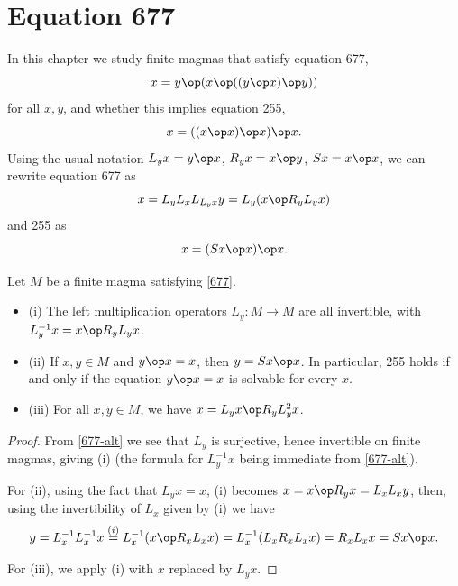 \chapter{Equation 677}\label{677-chapter}

In this chapter we study finite magmas that satisfy equation 677,
\begin{equation}\label{677}
  x = y \op (x \op ((y \op x) \op y))
\end{equation}
for all $x,y$, and whether this implies equation 255,
\begin{equation}\label{255}
  x = ((x \op x) \op x) \op x.
\end{equation}
Using the usual notation $L_y x = y \op x$, $R_y x = x \op y$, $Sx = x \op x$, we can rewrite equation 677 as
\begin{equation}\label{677-alt}
  x = L_y L_x L_{L_y x} y = L_y (x \op R_y L_y x)
\end{equation}
and 255 as
$$ x = (Sx \op x) \op x.$$

\begin{lemma}\label{677-basic} Let $M$ be a finite magma satisfying \eqref{677}.
  \begin{itemize}
  \item (i)  The left multiplication operators $L_y: M \to M$ are all invertible, with $L_y^{-1} x = x \op R_y L_y x$.
  \item (ii) If $x,y \in M$ and $y \op x = x$, then $y = Sx \op x$.  In particular, 255 holds if and only if the equation $y \op x = x$ is solvable for every $x$.
  \item (iii)  For all $x,y \in M$, we have $x = L_y x \op R_y L_y^2 x$.
\end{itemize}
\end{lemma}

\begin{proof}  From \eqref{677-alt} we see that $L_y$ is surjective, hence invertible on finite magmas, giving (i) (the formula for $L_y^{-1} x$ being immediate from \eqref{677-alt}).

  For (ii), using the fact that $L_y x = x$, (i) becomes $x = x \op R_y x = L_x L_x y$, then, using the invertibility of $L_x$ given by (i) we have
  \[y = L_x^{-1} L_x^{-1} x \stackrel{(i)}{=} L_x^{-1} (x \op R_x L_x x) = L_x^{-1} (L_x R_x L_x x) =
  R_x L_x x = Sx \op x.\]

  For (iii), we apply (i) with $x$ replaced by $L_y x$.
\end{proof}

